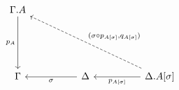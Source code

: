 \[\begin{tikzcd}
	{\Gamma.A} \\
	\\
	\\
	\Gamma && \Delta && {\Delta.A[\sigma]}
	\arrow["\sigma", from=4-3, to=4-1]
	\arrow["{p_{A[\sigma]}}", from=4-5, to=4-3]
	\arrow["{p_{A}}"', from=1-1, to=4-1]
	\arrow["{(\sigma \circ p_{A[\sigma]}, q_{A[\sigma]})}"', dashed, from=4-5, to=1-1]
\end{tikzcd}\]